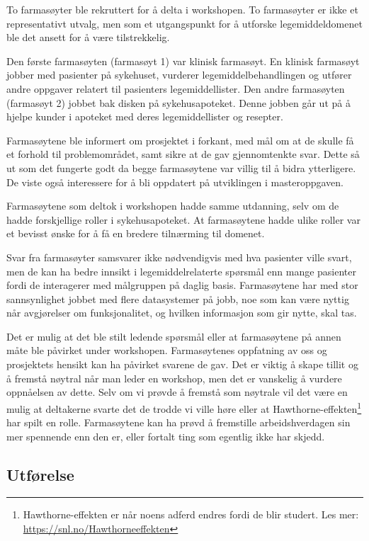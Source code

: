 To farmasøyter ble rekruttert for å delta i workshopen. To farmasøyter er ikke et representativt utvalg, men som et utgangspunkt for å utforske legemiddeldomenet ble det ansett for å være tilstrekkelig. 

Den første farmasøyten (farmasøyt 1) var klinisk farmasøyt. En klinisk farmasøyt jobber med pasienter på sykehuset, vurderer legemiddelbehandlingen og utfører andre oppgaver relatert til pasienters legemiddellister. Den andre farmasøyten (farmasøyt 2) jobbet bak disken på sykehusapoteket. Denne jobben går ut på å hjelpe kunder i apoteket med deres legemiddellister og resepter. 

Farmasøytene ble informert om prosjektet i forkant, med mål om at de skulle få et forhold til problemområdet, samt sikre at de gav gjennomtenkte svar. Dette så ut som det fungerte godt da begge farmasøytene var villig til å bidra ytterligere. De viste også interessere for å bli oppdatert på utviklingen i masteroppgaven.

Farmasøytene som deltok i workshopen hadde samme utdanning, selv om de hadde forskjellige roller i sykehusapoteket. At farmasøytene hadde ulike roller var et bevisst ønske for å få en bredere tilnærming til domenet.

Svar fra farmasøyter samsvarer ikke nødvendigvis med hva pasienter ville svart, men de kan ha bedre innsikt i legemiddelrelaterte spørsmål enn mange pasienter fordi de interagerer med målgruppen på daglig basis. Farmasøytene har med stor sannsynlighet jobbet med flere datasystemer på jobb, noe som kan være nyttig når avgjørelser om funksjonalitet, og hvilken informasjon som gir nytte, skal tas. 

Det er mulig at det ble stilt ledende spørsmål eller at farmasøytene på annen måte ble påvirket under workshopen. Farmasøytenes oppfatning av oss og prosjektets hensikt kan ha påvirket svarene de gav. Det er viktig å skape tillit og å fremstå nøytral når man leder en workshop, men det er vanskelig å vurdere oppnåelsen av dette. Selv om vi prøvde å fremstå som nøytrale vil det være en mulig at deltakerne svarte det de trodde vi ville høre eller at Hawthorne-effekten\footnote{Hawthorne-effekten er når noens adferd endres fordi de blir studert. Les mer: \url{https://snl.no/Hawthorneeffekten}} har spilt en rolle. Farmasøytene kan ha prøvd å fremstille arbeidshverdagen sin mer spennende enn den er, eller fortalt ting som egentlig ikke har skjedd. 

\subsection{Utførelse}

